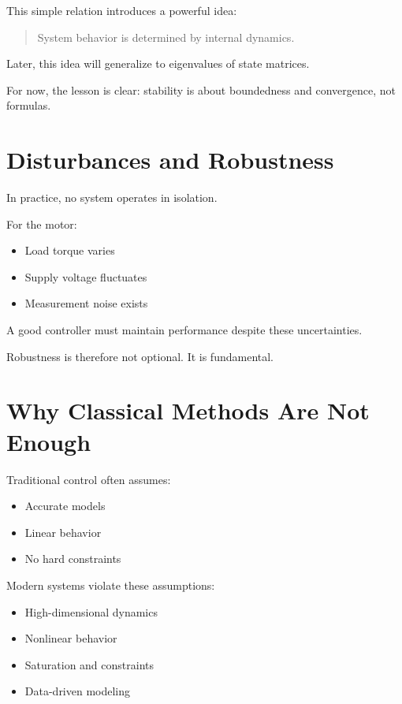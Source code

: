This simple relation introduces a powerful idea:

\begin{quote}
	System behavior is determined by internal dynamics.
\end{quote}

Later, this idea will generalize to eigenvalues of state matrices.

For now, the lesson is clear:
stability is about boundedness and convergence, not formulas.

\section{Disturbances and Robustness}

In practice, no system operates in isolation.

For the motor:
\begin{itemize}
	\item Load torque varies
	\item Supply voltage fluctuates
	\item Measurement noise exists
\end{itemize}

A good controller must maintain performance despite these uncertainties.

Robustness is therefore not optional.
It is fundamental.

\section{Why Classical Methods Are Not Enough}

Traditional control often assumes:

\begin{itemize}
	\item Accurate models
	\item Linear behavior
	\item No hard constraints
\end{itemize}

Modern systems violate these assumptions:

\begin{itemize}
	\item High-dimensional dynamics
	\item Nonlinear behavior
	\item Saturation and constraints
	\item Data-driven modeling
\end{itemize}

